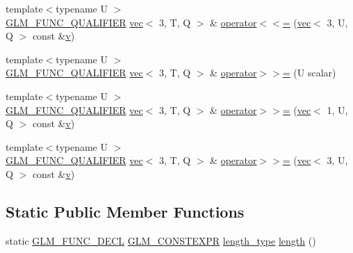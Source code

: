 \begin{DoxyCompactItemize}
\item 
{\footnotesize template$<$typename U $>$ }\\\hyperlink{setup_8hpp_a33fdea6f91c5f834105f7415e2a64407}{G\+L\+M\+\_\+\+F\+U\+N\+C\+\_\+\+Q\+U\+A\+L\+I\+F\+I\+ER} \hyperlink{structglm_1_1vec}{vec}$<$ 3, T, Q $>$ \& \hyperlink{structglm_1_1vec_3_013_00_01_t_00_01_q_01_4_a0e01e643e55134493df457aa0b17308e}{operator$<$$<$=} (\hyperlink{structglm_1_1vec}{vec}$<$ 3, U, Q $>$ const \&\hyperlink{_s_d_l__opengl_8h_a10a82eabcb59d2fcd74acee063775f90}{v})
\item 
{\footnotesize template$<$typename U $>$ }\\\hyperlink{setup_8hpp_a33fdea6f91c5f834105f7415e2a64407}{G\+L\+M\+\_\+\+F\+U\+N\+C\+\_\+\+Q\+U\+A\+L\+I\+F\+I\+ER} \hyperlink{structglm_1_1vec}{vec}$<$ 3, T, Q $>$ \& \hyperlink{structglm_1_1vec_3_013_00_01_t_00_01_q_01_4_a63341fff7a58c15da93cf79016cdeefa}{operator$>$$>$=} (U scalar)
\item 
{\footnotesize template$<$typename U $>$ }\\\hyperlink{setup_8hpp_a33fdea6f91c5f834105f7415e2a64407}{G\+L\+M\+\_\+\+F\+U\+N\+C\+\_\+\+Q\+U\+A\+L\+I\+F\+I\+ER} \hyperlink{structglm_1_1vec}{vec}$<$ 3, T, Q $>$ \& \hyperlink{structglm_1_1vec_3_013_00_01_t_00_01_q_01_4_afa71288540c821e11e3f316c16ed1274}{operator$>$$>$=} (\hyperlink{structglm_1_1vec}{vec}$<$ 1, U, Q $>$ const \&\hyperlink{_s_d_l__opengl_8h_a10a82eabcb59d2fcd74acee063775f90}{v})
\item 
{\footnotesize template$<$typename U $>$ }\\\hyperlink{setup_8hpp_a33fdea6f91c5f834105f7415e2a64407}{G\+L\+M\+\_\+\+F\+U\+N\+C\+\_\+\+Q\+U\+A\+L\+I\+F\+I\+ER} \hyperlink{structglm_1_1vec}{vec}$<$ 3, T, Q $>$ \& \hyperlink{structglm_1_1vec_3_013_00_01_t_00_01_q_01_4_a62459f7f3447a3022b4079f62a719824}{operator$>$$>$=} (\hyperlink{structglm_1_1vec}{vec}$<$ 3, U, Q $>$ const \&\hyperlink{_s_d_l__opengl_8h_a10a82eabcb59d2fcd74acee063775f90}{v})
\end{DoxyCompactItemize}
\subsection*{Static Public Member Functions}
\begin{DoxyCompactItemize}
\item 
static \hyperlink{setup_8hpp_ab2d052de21a70539923e9bcbf6e83a51}{G\+L\+M\+\_\+\+F\+U\+N\+C\+\_\+\+D\+E\+CL} \hyperlink{setup_8hpp_a08b807947b47031d3a511f03f89645ad}{G\+L\+M\+\_\+\+C\+O\+N\+S\+T\+E\+X\+PR} \hyperlink{structglm_1_1vec_3_013_00_01_t_00_01_q_01_4_ab586a87f82719bfdd180336a98843257}{length\+\_\+type} \hyperlink{structglm_1_1vec_3_013_00_01_t_00_01_q_01_4_a0dc7ddc517098d4c8257187df6be4cef}{length} ()
\end{DoxyCompactItemize}
